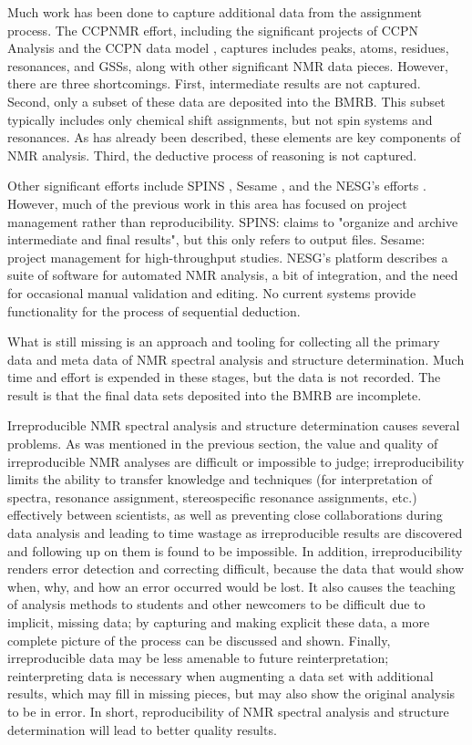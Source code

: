 Much work has been done to capture additional data from the assignment process.  
The CCPNMR effort, including the significant projects of CCPN Analysis and the 
CCPN data model \cite{ccpn}, captures includes peaks, atoms, residues, 
resonances, and GSSs, along with other significant NMR data pieces.  
However, there are three shortcomings.  First, intermediate results are not 
captured.  Second, only a subset of these data are deposited into the BMRB.  
This subset typically includes only chemical shift assignments, but not spin 
systems and resonances.   As has already been described, these elements are 
key components of NMR analysis.  Third, the deductive process of reasoning 
is not captured.

Other significant efforts include SPINS \cite{baran2006spins}, 
Sesame \cite{sesame}, and 
the NESG's efforts \cite{nesg2005nmr}.  However, much of the previous 
work in this area has focused on project management rather than reproducibility.
SPINS: claims to "organize and archive intermediate and final results", but 
this only refers to output files.  Sesame:  project management for 
high-throughput studies.  NESG's platform describes a suite of software for 
automated NMR analysis, a bit of integration, and the need for occasional 
manual validation and editing.  No current systems provide functionality for 
the process of sequential deduction.

What is still missing is an approach and tooling for collecting all the primary 
data and meta data of NMR spectral analysis and structure determination.  Much 
time and effort is expended in these stages, but the data is not recorded.  The 
result is that the final data sets deposited into the BMRB are incomplete.

Irreproducible NMR spectral analysis and structure determination causes 
several problems.  As was mentioned in the previous section, the value and 
quality of irreproducible NMR analyses are difficult or impossible to judge; 
irreproducibility limits the ability to transfer knowledge and techniques 
(for interpretation of spectra, resonance assignment, stereospecific resonance 
assignments, etc.) effectively between scientists, as well as preventing close 
collaborations during data analysis and leading to time wastage as 
irreproducible results are discovered and following up on them is found to be 
impossible.  In addition, irreproducibility renders error detection and 
correcting difficult, because the data that would show when, why, and how an 
error occurred would be lost.  It also causes the teaching of analysis methods 
to students and other newcomers to be difficult due to implicit, missing data; 
by capturing and making explicit these data, a more complete picture of the 
process can be discussed and shown.  Finally, irreproducible data may be less 
amenable to future reinterpretation; reinterpreting data is necessary when 
augmenting a data set with additional results, which may fill in missing 
pieces, but may also show the original analysis to be in error.  In short, 
reproducibility of NMR spectral analysis and structure determination will lead 
to better quality results.


